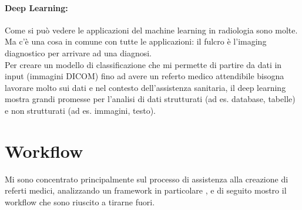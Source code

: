 \documentclass[12pt,a4paper]{report}
\begin{document}
\paragraph*{Deep Learning:}
Come si può vedere le applicazioni del machine learning in radiologia sono molte. Ma c’è una cosa in comune con tutte le applicazioni: il fulcro è l’imaging diagnostico per arrivare ad una diagnosi.\\
Per creare un modello di classificazione che mi permette di partire da dati in input (immagini DICOM) fino ad avere un referto medico attendibile bisogna lavorare molto sui dati e nel contesto dell'assistenza sanitaria, il deep learning mostra grandi promesse per l'analisi di dati strutturati (ad es. database, tabelle) e non strutturati (ad es. immagini, testo).


\section{Workflow}
Mi sono concentrato principalmente sul processo di assistenza alla creazione di referti medici, analizzando un framework in particolare \cite{singh2019chest}, e di seguito mostro il workflow che sono riuscito a tirarne fuori.
\end{document}
